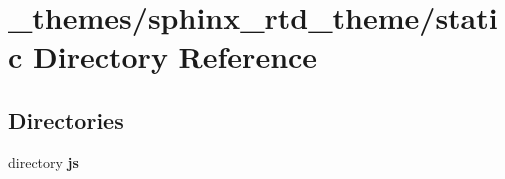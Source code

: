 \section{\-\_\-themes/sphinx\-\_\-rtd\-\_\-theme/static Directory Reference}
\label{dir_1330d5e4af8a20624f2d159b23b380a6}
\subsection*{Directories}
\begin{DoxyCompactItemize}
\item 
directory {\bf js}
\end{DoxyCompactItemize}
